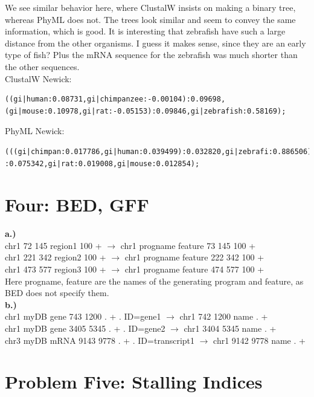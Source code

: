 \documentclass[10pt]{article} %
\begin{document}
We see similar behavior here, where ClustalW insists on making a binary tree,
whereas PhyML does not. The trees look similar and seem to convey the same
information, which is good. It is interesting that zebrafish have such a
large distance from the other organisms. I guess it makes sense, since they
are an early type of fish? Plus the mRNA sequence for the zebrafish was much shorter
than the other sequences.\\

ClustalW Newick:
\begin{verbatim}
((gi|human:0.08731,gi|chimpanzee:-0.00104):0.09698,
(gi|mouse:0.10978,gi|rat:-0.05153):0.09846,gi|zebrafish:0.58169);
\end{verbatim}

PhyML Newick:
\begin{verbatim}
(((gi|chimpan:0.017786,gi|human:0.039499):0.032820,gi|zebrafi:0.886506)
:0.075342,gi|rat:0.019008,gi|mouse:0.012854);
\end{verbatim}

\section{Four: BED, GFF}

\textbf{a.)}\\
chr1 72 145 region1 100 + $\rightarrow$ chr1 progname feature 73 145 100 +\\
chr1 221 342 region2 100 + $\rightarrow$ chr1 progname feature 222 342 100 +\\
chr1 473 577 region3 100 + $\rightarrow$ chr1 progname feature 474 577 100 +\\

Here progname, feature are the names of the generating program and feature,
as BED does not specify them.\\

\textbf{b.)}\\
chr1 myDB gene 743 1200 . + . ID=gene1 $\rightarrow$ chr1 742 1200 name . +\\
chr1 myDB gene 3405 5345 . + . ID=gene2 $\rightarrow$ chr1 3404 5345 name . +\\
chr3 myDB mRNA 9143 9778 . + . ID=transcript1 $\rightarrow$ chr1 9142 9778 name . +\\

\section{Problem Five: Stalling Indices}
\end{document}
